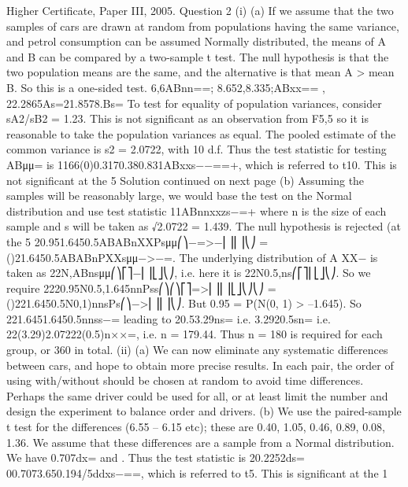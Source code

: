 Higher Certificate, Paper III, 2005. Question 2
(i) (a) If we assume that the two samples of cars are drawn at random from populations having the same variance, and petrol consumption can be assumed Normally distributed, the means of A and B can be compared by a two-sample t test.
The null hypothesis is that the two population means are the same, and the alternative is that mean A > mean B. So this is a one-sided test.
6,6ABnn==;
8.652,8.335;ABxx==
, 22.2865As=21.8578.Bs=
To test for equality of population variances, consider sA2/sB2 = 1.23. This is not significant as an observation from F5,5 so it is reasonable to take the population variances as equal.
The pooled estimate of the common variance is s2 = 2.0722, with 10 d.f.
Thus the test statistic for testing ABμμ= is
1166(0)0.3170.380.831ABxxs−−==+,
which is referred to t10. This is not significant at the 5%
Solution continued on next page
(b) Assuming the samples will be reasonably large, we would base the test on the Normal distribution and use test statistic 11ABnnxxzs−=+ where n is the size of each sample and s will be taken as √2.0722 = 1.439. The null hypothesis is rejected (at the 5%
20.951.6450.5ABABnXXPsμμ⎛⎞−=>−⎜⎟⎜⎟⎝⎠
= ()21.6450.5ABABnPXXsμμ−>−=.
The underlying distribution of A XX− is taken as 22N,ABnsμμ⎛⎞⎡⎤−⎜⎟⎣⎦⎝⎠, i.e. here it is 22N0.5,ns⎛⎡⎤⎜⎣⎦⎝⎠. So we require
2220.95N0.5,1.645nnPss⎛⎞⎛⎞⎡⎤=>⎜⎟⎜⎟⎣⎦⎝⎠⎝⎠ = ()221.6450.5N0,1)nnsPs⎛⎞−>⎜⎟⎜⎟⎝⎠.
But 0.95 = P(N(0, 1) > –1.645).
So 221.6451.6450.5nnss−= leading to
20.53.29ns= i.e. 3.2920.5sn= i.e. 22(3.29)2.07222(0.5)n××=,
i.e. n = 179.44. Thus n = 180 is required for each group, or 360 in total.
(ii) (a) We can now eliminate any systematic differences between cars, and hope to obtain more precise results.
In each pair, the order of using with/without should be chosen at random to avoid time differences. Perhaps the same driver could be used for all, or at least limit the number and design the experiment to balance order and drivers.
(b) We use the paired-sample t test for the differences (6.55 – 6.15 etc); these are 0.40, 1.05, 0.46, 0.89, 0.08, 1.36. We assume that these differences are a sample from a Normal distribution.
We have 0.707dx= and . Thus the test statistic is 20.2252ds=
00.7073.650.194/5ddxs−==,
which is referred to t5. This is significant at the 1%
